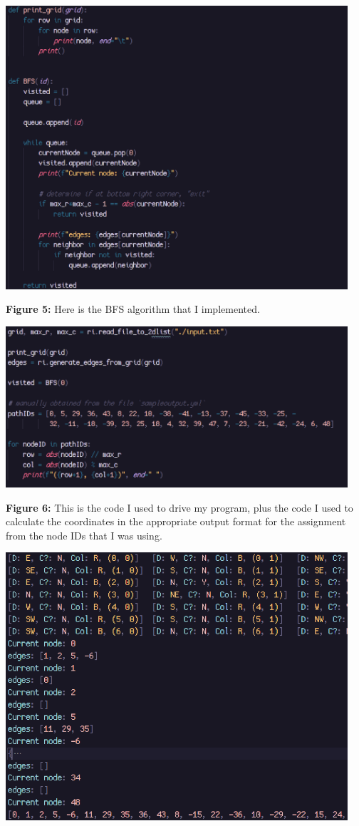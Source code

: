 \documentclass[12pt]{article}
\begin{document}
\begin{center}
    \includegraphics[width=5in]{algorithm.png}

    \textbf{Figure 5:} Here is the BFS algorithm that I implemented.

    \includegraphics[width=5in]{driver.png}
    
    \textbf{Figure 6:} This is the code I used to drive my program, plus
    the code I used to calculate the coordinates in the appropriate output
    format for the assignment from the node IDs that I was using.

    \includegraphics[width=5in]{sample-output.png}


\end{center}
\end{document}

